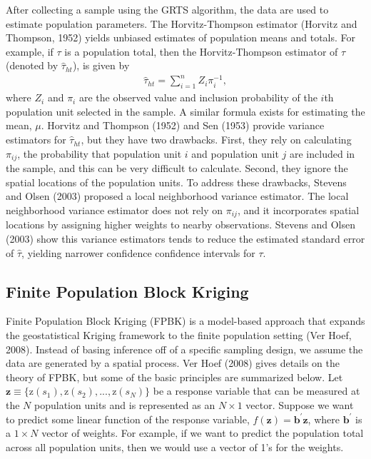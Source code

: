 \documentclass[]{elsarticle} %
\begin{document}
After collecting a sample using the GRTS algorithm, the data are used to
estimate population parameters. The Horvitz-Thompson estimator (Horvitz
and Thompson, 1952) yields unbiased estimates of population means and
totals. For example, if \(\tau\) is a population total, then the
Horvitz-Thompson estimator of \(\tau\) (denoted by \(\hat{\tau}_{ht}\)),
is given by \begin{align}\label{eq:ht}
  \hat{\tau}_{ht} = \sum_{i = 1}^n Z_i \pi_i^{-1},
\end{align} where \(Z_i\) and \(\pi_i\) are the observed value and
inclusion probability of the \(i\)th population unit selected in the
sample. A similar formula exists for estimating the mean, \(\mu\).
Horvitz and Thompson (1952) and Sen (1953) provide variance estimators
for \(\hat{\tau}_{ht}\), but they have two drawbacks. First, they rely
on calculating \(\pi_{ij}\), the probability that population unit \(i\)
and population unit \(j\) are included in the sample, and this can be
very difficult to calculate. Second, they ignore the spatial locations
of the population units. To address these drawbacks, Stevens and Olsen
(2003) proposed a local neighborhood variance estimator. The local
neighborhood variance estimator does not rely on \(\pi_{ij}\), and it
incorporates spatial locations by assigning higher weights to nearby
observations. Stevens and Olsen (2003) show this variance estimators
tends to reduce the estimated standard error of \(\hat{\tau}\), yielding
narrower confidence confidence intervals for \(\tau\).

\hypertarget{finite-population-block-kriging}{%
\subsection{Finite Population Block
Kriging}\label{finite-population-block-kriging}}

Finite Population Block Kriging (FPBK) is a model-based approach that
expands the geostatistical Kriging framework to the finite population
setting (Ver Hoef, 2008). Instead of basing inference off of a specific
sampling design, we assume the data are generated by a spatial process.
Ver Hoef (2008) gives details on the theory of FPBK, but some of the
basic principles are summarized below. Let
\(\mathbf{z} \equiv \{\text{z}(s_1), \text{z}(s_2), . . . , \text{z}(s_N) \}\)
be a response variable that can be measured at the \(N\) population
units and is represented as an \(N \times 1\) vector. Suppose we want to
predict some linear function of the response variable,
\(f(\mathbf{z}) = \mathbf{b}^\prime \mathbf{z}\), where
\(\mathbf{b}^\prime\) is a \(1 \times N\) vector of weights. For
example, if we want to predict the population total across all
population units, then we would use a vector of 1's for the weights.
\end{document}
